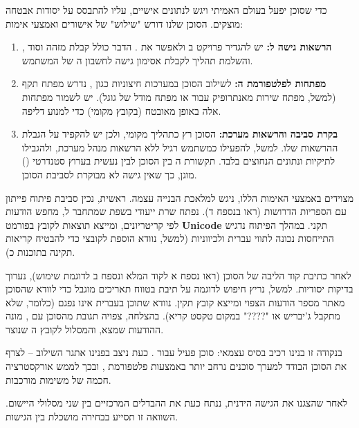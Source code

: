 כדי שסוכן יפעל בעולם האמיתי ויגש לנתונים אישיים, עליו להתבסס על יסודות אבטחה מוצקים. הסוכן שלנו דורש "שילוש" של אישורים ואמצעי אימות:
\begin{enumerate}
  \item \textbf{הרשאות גישה ל:} יש להגדיר פרויקט ב ולאפשר את . הדבר כולל קבלת מזהה  וסוד , והשלמת תהליך  לקבלת אסימון גישה לחשבון ה של המשתמש.
  \item \textbf{מפתחות  לפלטפורמת ה:} לשילוב הסוכן במערכות  חיצוניות כגון , נדרש מפתח  תקף (למשל, מפתח שירות מאנתרופיק עבור  או מפתח מודל  של גוגל). יש לשמור מפתחות אלה באופן מאובטח (בקובץ  מקומי) כדי למנוע דליפה.
  \item \textbf{בקרת סביבה והרשאות מערכת:} הסוכן רץ כתהליך מקומי, ולכן יש להקפיד על הגבלת ההרשאות שלו. למשל, להפעילו כמשתמש רגיל ללא הרשאות מנהל מערכת, ולהגבילו לתיקיות ונתונים הנחוצים בלבד. תקשורת ה בין הסוכן לבין  נעשית בערוץ סטנדרטי () מוגן, כך שאין גישה לא מבוקרת לסביבת הסוכן.
\end{enumerate}

מצוידים באמצעי האימות הללו, ניגש למלאכת הבנייה עצמה. ראשית, נכין סביבת פיתוח פייתון עם הספריות הדרושות (ראו  בנספח ד). נפתח שרת  ייעודי בשפת  שמתחבר ל, מחפש הודעות לפי קריטריונים, ומייצא תוצאות לקובץ  בפורמט \textbf{Unicode} תקני. במהלך הפיתוח נדגיש התייחסות נכונה לתווי עברית ולכיווניות (למשל, נוודא הוספת  לקובצי  כדי להבטיח קריאות תקינה בתוכנות כ).

לאחר כתיבת קוד הליבה של הסוכן (ראו נספח א לקוד המלא ונספח ב לדוגמת שימוש), נערוך בדיקות יסודיות. למשל, נריץ חיפוש לדוגמה על תיבת  בטווח תאריכים מוגבל כדי לוודא שהסוכן מאתר מספר הודעות הצפוי ומייצא קובץ תקין. נוודא שתוכן בעברית אינו נפגם (כלומר, שלא מתקבל ג'יבריש או "????" במקום טקסט קריא). בהצלחה, צפויה תגובת  מהסוכן עם , מונה ההודעות שמצא, והמסלול לקובץ ה שנוצר.

בנקודה זו בנינו רכיב בסיס עצמאי: סוכן  פעיל עבור . כעת ניצב בפנינו אתגר השילוב – לצרף את הסוכן הבודד למערך סוכנים נרחב יותר באמצעות פלטפורמת , ובכך לממש אורקסטרציה חכמה של משימות מורכבות.


לאחר שהצגנו את הגישה הידנית, ננתח כעת את ההבדלים המרכזיים בין שני מסלולי היישום. השוואה זו תסייע בבחירה מושכלת בין הגישות.

